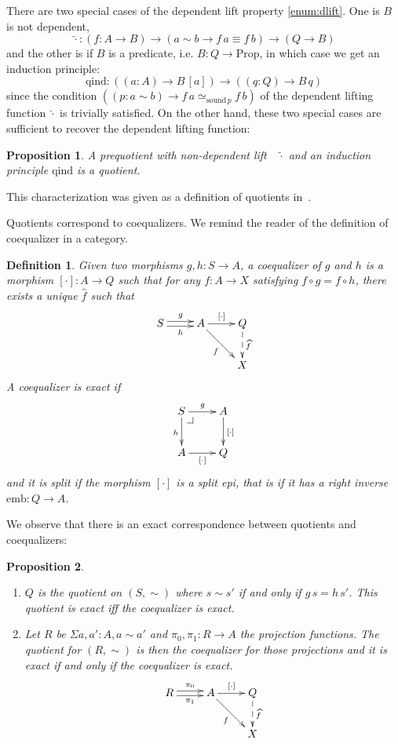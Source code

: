 \documentclass[preprint,12pt]{elsarticle}
\makeatletter
\newtheorem{definition}{Definition}[section]
\newtheorem{proposition}{Proposition}[section]
\newcommand{\prop}{\mathrm{Prop}}
\newcommand{\bocks}[1]{[#1]}
\newcommand{\lift}[1]{\widehat{#1}}
\newcommand{\nlift}[1]{\tilde{#1}}
\newcommand{\sound}{\mathrm{sound}}
\newcommand{\qind}{\mathrm{qind}}
\newcommand{\emb}{\mathrm{emb}}
\newcommand{\pullbackcorner}[1][dr]{\save*!/#1-1.2pc/#1:(-1,1)@^{|-}\restore}
\makeatother
\begin{document}
There are two special cases of the dependent lift property \ref{enum:dlift}. One is $B$ is not dependent,
 \[\nlift\cdot: (f\colon A \to B) \to (a\sim b \to f\,a \equiv f\,b) \to (Q \to B)\]
and the other is if $B$ is a predicate, i.e. $B : Q\to \prop$, in which case we get an induction principle:
\[\qind \colon((a\colon A)\to B \,\bocks a)\to ((q\colon Q)\to B\,q)\]
since the condition $((p:a\sim b) \to f\,a \simeq_{\sound\,p}f\,b) $  of the dependent lifting function $\lift\cdot$ is trivially satisfied.
On the other hand, these two special cases are sufficient to recover the dependent lifting function:      


\begin{proposition}\label{prop:nlifteq}
A prequotient with non-dependent lift~~$\nlift\cdot$ and an induction principle $\qind$ is a quotient.
\end{proposition}
This characterization was given as a definition of quotients in~\cite{hofmann:thesis}.


Quotients correspond to coequalizers. We remind the reader of the definition of coequalizer in a category. 

\begin{definition}
Given two morphisms $g,h : S\to A$, a \emph{coequalizer} of $g$ and $h$ is a morphism $\bocks\cdot:A\to Q$ such that for any $f:A\to X$ satisfying $f \circ g = f \circ h$, there exists a unique $\lift f$ such that  
\[\xymatrix{
S\ar@<0.5ex>[r]^g\ar@<-0.5ex>[r]_h& A\ar[r]^{\bocks\cdot}\ar[dr]_{f} & Q\ar@{-->}[d]^{\lift f}\\
&&X
}\]
A coequalizer is \emph{exact} if 
\[\xymatrix{
S\pullbackcorner\ar[r]^g\ar[d]_h & A\ar[d]^{\bocks\cdot} \\
A\ar[r]_{\bocks\cdot} & Q
}\]
and it is \emph{split} if the morphism $\bocks\cdot$ is a split epi, that is if it has a right inverse $\emb : Q \to A$.
\end{definition}

We observe that there is an exact correspondence between quotients and coequalizers:
\begin{proposition}\hfill
\begin{enumerate}
\item $Q$ is the quotient on $(S,\sim)$ where $s\sim s'$ if and only if $g\,s=h\,s'$.
This quotient is exact if{f} the coequalizer is exact.
\item Let $R$ be $\Sigma a,a':A,a\sim a'$ and $\pi_0,\pi_1 : R\to A$ the projection functions. The quotient for $(R,\sim)$ is then the coequalizer for those projections and it is exact if and only if the coequalizer is exact.
\[\xymatrix{
R\ar@<0.5ex>[r]^{\pi_0}\ar@<-0.5ex>[r]_{\pi_1}& A\ar[r]^{\bocks\cdot}\ar[dr]_{f} & Q\ar@{-->}[d]^{\lift f}\\
&&X
}\]
\end{enumerate}
\end{proposition}
\end{document}

